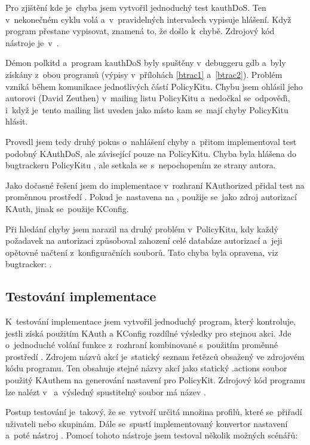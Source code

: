 Pro zjištění kde je~chyba jsem vytvořil jednoduchý test kauthDoS. Ten v~nekonečném cyklu volá  a~v~pravidelných intervalech vypisuje hlášení. Když program přestane vypisovat, znamená to, že došlo k~chybě. Zdrojový kód nástroje je~v~.

Démon polkitd a~program kauthDoS byly spuštěny v~debuggeru gdb a~byly získány  z~obou programů (výpisy v~přílohách \ref{btrac1} a~\ref{btrac2}). Problém vzniká během komunikace jednotlivých částí PolicyKitu. Chybu jsem ohlásil jeho autorovi (David Zeuthen) v~mailing listu PolicyKitu \cite{bugrepmailinglist} a~nedočkal se~odpověďi, i~když je~tento mailing list uveden jako místo kam se~mají chyby PolicyKitu hlásit.

Provedl jsem tedy druhý pokus o~nahlášení chyby a~přitom implementoval test podobný KAuthDoS, ale závisející pouze na PolicyKitu.
Chyba byla hlášena do bugtrackeru PolicyKitu \cite{bugreptracker}, ale setkala se~s~nepochopením ze strany autora.

Jako dočasné řešení jsem do implementace v~rozhraní KAuthorized přidal test na proměnnou prostředí . Pokud je~nastavena na , použije se~jako zdroj autorizací KAuth, jinak se~použije KConfig.

Při hledání chyby jsem narazil na druhý problém v~PolicyKitu, kdy každý požadavek na autorizaci způsoboval zahození celé databáze autorizací a~jeji opětovné načtení z~konfiguračních souborů. Tato chyba byla opravena, viz bugtracker: \cite{smallbugrep}.

\subsection*{Testování implementace}
K~testování implementace jsem vytvořil jednoduchý program, který kontroluje, jestli získá použitím KAuth a KConfig rozdílné výsledky pro stejnou akci. Jde o~jednoduché volání funkce  z~rozhraní  kombinované s~použitím proměnné prostředí . Zdrojem názvů akcí je~statický seznam řetězců obsažený ve zdrojovém kódu programu. Ten obsahuje stejné názvy akcí jako statický .actions soubor použitý KAuthem na generování nastavení pro PolicyKit. Zdrojový kód programu lze nalézt v~ a~výsledný spustitelný soubor má název .

Postup testování je~takový, že se~vytvoří určitá množina profilů, které se~přiřadí uživateli nebo skupinám. Dále se~spustí implementovaný konvertor nastavení  a~poté nástroj . Pomocí tohoto nástroje jsem testoval několik možných scénářů:

